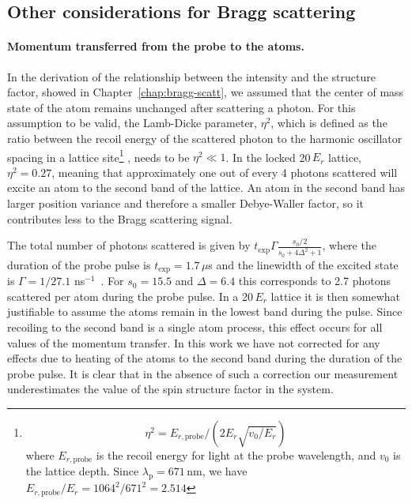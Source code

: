\subsection{Other considerations for Bragg scattering} 

\paragraph{Momentum transferred from the probe to the atoms.}

In the derivation of the relationship between the intensity and the structure
factor, showed in Chapter~\ref{chap:bragg-scatt}, we assumed that the center of
mass state of the atom remains unchanged after scattering a photon.  For this
assumption to be valid, the Lamb-Dicke  parameter, $\eta^{2}$, which is defined
as the ratio between the recoil energy of the scattered photon to the harmonic
oscillator spacing in a lattice site\footnote{  \begin{equation} \eta^{2}=
E_{r,\text{probe}} /( 2E_{r} \sqrt{v_{0}/E_{r}})\end{equation} where
$E_{r,\text{probe}}$ is the recoil energy for light at the probe wavelength,
and $v_{0}$ is the lattice depth. Since
$\lambda_{\mathrm{p}}=671\,\mathrm{nm}$, we have $E_{r,\text{probe}} /E_{r} =
1064^{2}/671^{2}=2.514$ } , needs to be $\eta^{2} \ll 1$.  In the locked
20\,$E_{r}$ lattice, $\eta^{2}= 0.27$, meaning that approximately one out of
every 4 photons scattered will excite an atom to the second band of the
lattice.    An atom in the second band has larger position variance and
therefore a smaller Debye-Waller factor,  so it contributes less to the Bragg
scattering signal.

The total number of photons scattered is given by  $t_{\text{exp}} \Gamma
\frac{s_{0}/2}{s_{0} + 4\Delta^{2}+1 }$,  where the duration of the probe pulse
is $t_{\text{exp}}=1.7\,\mu$s and the linewidth of the excited state is
$\Gamma=1/27.1$\,\,ns$^{-1}$~\cite{McAlexander1996}.  For $s_{0}=15.5$ and
$\Delta = 6.4$ this corresponds to 2.7 photons scattered per atom during the
probe pulse.   In a 20\,$E_{r}$ lattice it is then somewhat justifiable to
assume the atoms remain in the lowest band during the pulse.  Since recoiling
to the second band is a single atom process, this effect occurs for all values
of the momentum transfer.  In this work we have not corrected for any effects
due to heating of the atoms to the second band during the duration of the probe
pulse.  It is clear that in the absence of such a correction our measurement
underestimates the value of the spin structure factor in the system.  

